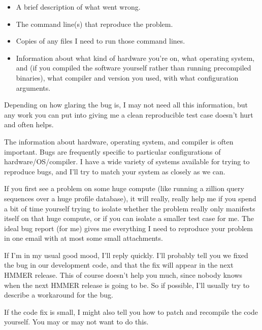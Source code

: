 \begin{itemize}
 \item A brief description of what went wrong.
 \item The command line(s) that reproduce the problem.
 \item Copies of any files I need to run those command lines.
 \item Information about what kind of hardware you're on, what
   operating system, and (if you compiled the software yourself rather
   than running precompiled binaries), what compiler and version you
   used, with what configuration arguments.
\end{itemize}

Depending on how glaring the bug is, I may not need all this
information, but any work you can put into giving me a clean
reproducible test case doesn't hurt and often helps.

The information about hardware, operating system, and compiler is
often important. Bugs are frequently specific to particular
configurations of hardware/OS/compiler.  I have a wide variety of
systems available for trying to reproduce bugs, and I'll try to match
your system as closely as we can.

If you first see a problem on some huge compute (like running a
zillion query sequences over a huge profile database), it will really,
really help me if you spend a bit of time yourself trying to isolate
whether the problem really only manifests itself on that huge compute,
or if you can isolate a smaller test case for me. The ideal bug report
(for me) gives me everything I need to reproduce your problem in one
email with at most some small attachments.  

If I'm in my usual good mood, I'll reply quickly.  I'll probably
tell you we fixed the bug in our development code, and that the fix
will appear in the next HMMER release. This of course doesn't help you
much, since nobody knows when the next HMMER release is going to be.
So if possible, I'll usually try to describe a workaround for the
bug.

If the code fix is small, I might also tell you how to patch and
recompile the code yourself. You may or may not want to do this.






